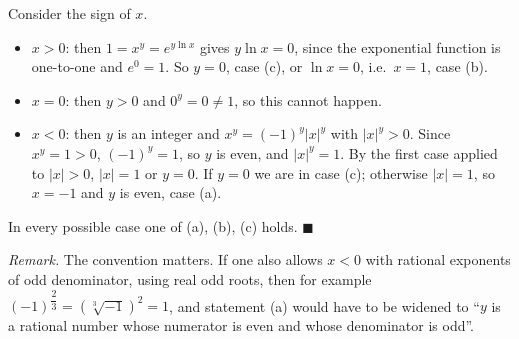 Consider the sign of $x$.
\begin{itemize}
\item $x>0$: then $1=x^y=e^{y\ln x}$ gives $y\ln x=0$, since the exponential function is one-to-one and $e^0=1$. So $y=0$, case (c), or $\ln x=0$, i.e.\ $x=1$, case (b).
\item $x=0$: then $y>0$ and $0^y=0\ne1$, so this cannot happen.
\item $x<0$: then $y$ is an integer and $x^y=(-1)^y|x|^y$ with $|x|^y>0$. Since $x^y=1>0$, $(-1)^y=1$, so $y$ is even, and $|x|^y=1$. By the first case applied to $|x|>0$, $|x|=1$ or $y=0$. If $y=0$ we are in case (c); otherwise $|x|=1$, so $x=-1$ and $y$ is even, case (a).
\end{itemize}
In every possible case one of (a), (b), (c) holds. $\blacksquare$

\emph{Remark.} The convention matters. If one also allows $x<0$ with rational exponents of odd denominator, using real odd roots, then for example $(-1)^{\dfrac{2}{3}}=\left(\sqrt[3]{-1}\right)^2=1$, and statement (a) would have to be widened to ``$y$ is a rational number whose numerator is even and whose denominator is odd''.
